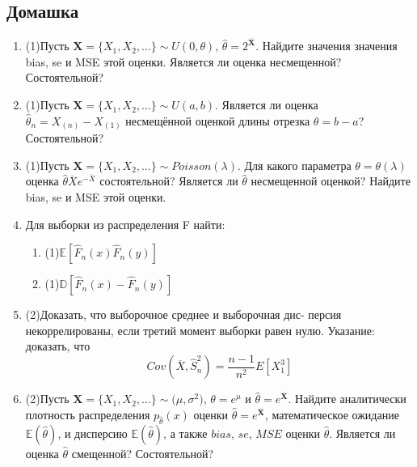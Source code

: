 \documentclass[a4paper, 14pt]{extarticle}
\begin{document}
\subsection*{Домашка}
\begin{enumerate}


\item (1)Пусть $\textbf{X} = \{X_1, X_2, \dots\} \sim U(0, \theta)$, $\hat\theta = 2^{\overline{\textbf{X}}}$. Найдите значения значения bias, se и MSE этой
оценки. Является ли оценка несмещенной? Состоятельной?

\item (1)Пусть  $\textbf{X} = \{X_1, X_2, \dots\} \sim U(a, b)$. Является ли оценка $\hat\theta_n = X_{(n)} - X_{(1)}$
несмещённой оценкой длины отрезка $\theta = b - a$? Состоятельной?

\item (1)Пусть $\textbf{X} = \{X_1, X_2, \dots\} \sim Poisson(\lambda)$. Для какого параметра $\theta = \theta(\lambda)$ оценка $\hat \theta \overline{X}e^{-\overline{X}}$
состоятельной? Является ли $\hat \theta$ несмещенной оценкой? Найдите bias, se и MSE этой оценки.

\item Для выборки из распределения F  найти: 
\begin{enumerate}
\item (1)$\mathbb{E}[\hat F_n(x) \hat F_n(y)]$
\item (1)$\mathbb{D}[\hat F_n(x) - \hat F_n(y)]$ 
\end{enumerate}

\item (2)Доказать, что выборочное среднее  и выборочная дис-
персия  некоррелированы, если третий момент выборки равен
нулю. Указание: доказать, что $$Cov(\overline{X}, \hat S_n^2) = \frac{n-1}{n^2}
E[X_1^3]$$

\item (2)Пусть $\textbf{X} = \{X_1, X_2, \dots\} \sim \mathcal(\mu, \sigma^2)$, $\theta = e^{\mu}$ и $\hat \theta = e^{\overline{\textbf{X}}}$. 
Найдите аналитически плотность распределения $p_{\hat\theta}(x)$ оценки $\hat \theta = e^{\overline{\textbf{X}}}$, 
математическое ожидание $\mathbb{E}(\hat \theta)$,  и дисперсию $\mathbb{E}(\hat \theta)$, а также $bias$, $se$, $MSE$ оценки $\hat \theta$. 
Является ли оценка $\hat \theta$ смещенной? Состоятельной?

\end{enumerate}
\end{document}
